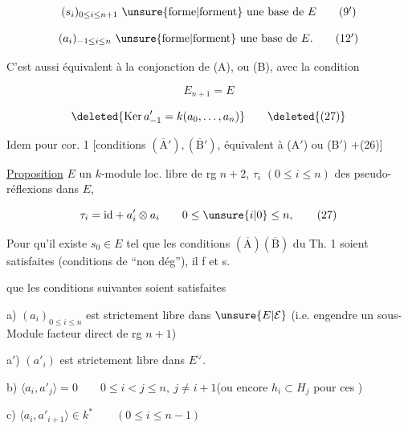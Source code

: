 \[(s_i)_{0\leq i\leq n+1}\text{ \unsure{forme|forment} une base de }E\tag*{(9$'$)}\]

\[(a_i)_{-1\leq i\leq n}\text{ \unsure{forme|forment} une base de }E.\tag*{(12$'$)}\]

 C'est aussi équivalent à la conjonction de (A), ou (B), avec la condition

\[E_{n+1}=E\tag*{(26)}\]

 

\[\deleted{\operatorname{Ker}a'_{-1}=k(a_0,\ldots,a_n)}\tag*{\deleted{(27)}}\]


Idem pour cor. 1 [conditions $(\overline{\mathrm A}'),(\overline{\mathrm B}')$, équivalent à (A$'$) ou (B$'$) $+{}$(26)]

\uline{Proposition}  $E$ un $k$-module loc. libre de rg $n+2$, $\tau_i$ $(0\leq i\leq n)$ des pseudo-réflexions dans $E$,

\[\tau_i=\mathrm{id}+a'_i\otimes a_i\qquad 0\leq\unsure{i|0}\leq n,\tag*{(27)}\]


Pour qu'il existe   $s_0\in E$ tel que les conditions $(\overline{\mathrm A})(\overline{\mathrm B})$ du Th. 1  soient satisfaites (conditions  de ``non dég''), il f et s.


que les conditions suivantes soient satisfaites

a) $(a_i)_{0\leq i\leq n}$ est  strictement libre dans $\unsure{E|\mathcal E}$ (i.e. engendre un sous-Module facteur direct de rg $n+1$)

a$'$) $(a'_i)$ est strictement libre dans $E^\vee$.

b) $\langle a_i,a'_j\rangle=0\qquad 0\leq i<j\leq n,\ j\ne i+1$\quad (ou encore $h_i\subset H_j$ pour ces )

c)  $\langle a_i,a'_{i+1}\rangle\in k^*\qquad(0\leq i\leq n-1)$

